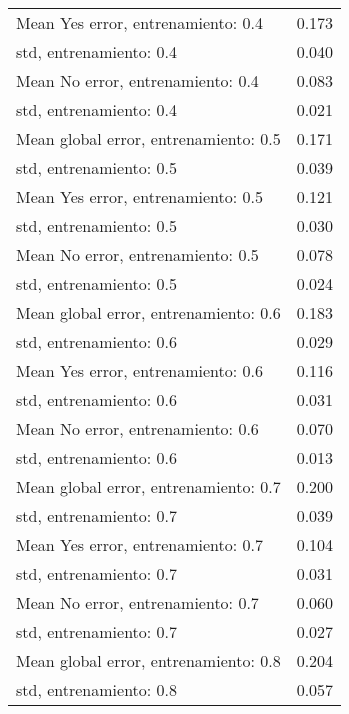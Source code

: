 \begin{longtable}{p{4cm}|p{1.5cm}}
Mean Yes error, entrenamiento: 0.4    &                        0.173 \\
std, entrenamiento: 0.4               &                        0.040 \\
Mean No error, entrenamiento: 0.4     &                        0.083 \\
std, entrenamiento: 0.4               &                        0.021 \\
Mean global error, entrenamiento: 0.5 &                        0.171 \\
std, entrenamiento: 0.5               &                        0.039 \\
Mean Yes error, entrenamiento: 0.5    &                        0.121 \\
std, entrenamiento: 0.5               &                        0.030 \\
Mean No error, entrenamiento: 0.5     &                        0.078 \\
std, entrenamiento: 0.5               &                        0.024 \\
Mean global error, entrenamiento: 0.6 &                        0.183 \\
std, entrenamiento: 0.6               &                        0.029 \\
Mean Yes error, entrenamiento: 0.6    &                        0.116 \\
std, entrenamiento: 0.6               &                        0.031 \\
Mean No error, entrenamiento: 0.6     &                        0.070 \\
std, entrenamiento: 0.6               &                        0.013 \\
Mean global error, entrenamiento: 0.7 &                        0.200 \\
std, entrenamiento: 0.7               &                        0.039 \\
Mean Yes error, entrenamiento: 0.7    &                        0.104 \\
std, entrenamiento: 0.7               &                        0.031 \\
Mean No error, entrenamiento: 0.7     &                        0.060 \\
std, entrenamiento: 0.7               &                        0.027 \\
Mean global error, entrenamiento: 0.8 &                        0.204 \\
std, entrenamiento: 0.8               &                        0.057 \\

\end{longtable}
